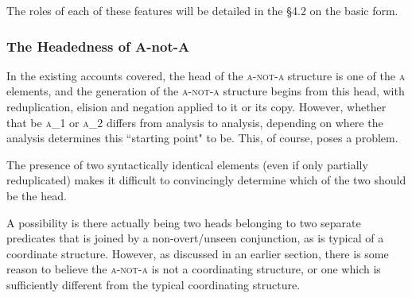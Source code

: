 \documentclass[12pt, UTF8]{article}
\begin{document}
\begin{exe}
\avmvskip{.5ex}\avmhskip{3em}


\end{exe}

The roles of each of these features will be detailed in the \S 4.2 on the basic form.

\subsubsection{The Headedness of A-not-A}

In the existing accounts covered, the head of the \textsc{a-not-a} structure is one of the \textsc{a} elements, and the generation of the \textsc{a-not-a} structure begins from this head, with reduplication, elision and negation applied to it or its copy. However, whether that be \textsc{a_1} or \textsc{a_2} differs from analysis to analysis, depending on where the analysis determines this ``starting point" to be. This, of course, poses a problem.

The presence of two syntactically identical elements (even if only partially reduplicated) makes it difficult to convincingly determine which of the two should be the head.

A possibility is there actually being two heads belonging to two separate predicates that is joined by a non-overt/unseen conjunction, as is typical of a coordinate structure. However, as discussed in an earlier section, there is some reason to believe the \textsc{a-not-a} is not a coordinating structure, or one which is sufficiently different from the typical coordinating structure.
\end{document}
